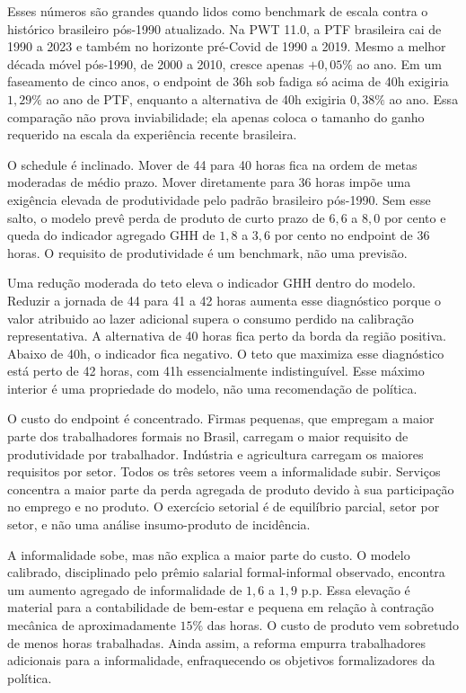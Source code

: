 \documentclass[10pt,twocolumn]{article}
\begin{document}
Esses n\'umeros s\~ao grandes quando lidos como benchmark de escala contra o hist\'orico brasileiro p\'os-1990 atualizado. Na PWT 11.0, a PTF brasileira cai de 1990 a 2023 e tamb\'em no horizonte pr\'e-Covid de 1990 a 2019. Mesmo a melhor d\'ecada m\'ovel p\'os-1990, de 2000 a 2010, cresce apenas $+0{,}05\%$ ao ano. Em um faseamento de cinco anos, o endpoint de 36h sob fadiga s\'o acima de 40h exigiria $1{,}29\%$ ao ano de PTF, enquanto a alternativa de 40h exigiria $0{,}38\%$ ao ano. Essa compara\c{c}\~ao n\~ao prova inviabilidade; ela apenas coloca o tamanho do ganho requerido na escala da experi\^encia recente brasileira.

O schedule \'e inclinado. Mover de 44 para 40 horas fica na ordem de metas moderadas de m\'edio prazo. Mover diretamente para 36 horas imp\~oe uma exig\^encia elevada de produtividade pelo padr\~ao brasileiro p\'os-1990. Sem esse salto, o modelo prev\^e perda de produto de curto prazo de $6{,}6$ a $8{,}0$ por cento e queda do indicador agregado GHH de $1{,}8$ a $3{,}6$ por cento no endpoint de 36 horas. O requisito de produtividade \'e um benchmark, n\~ao uma previs\~ao.

Uma redu\c{c}\~ao moderada do teto eleva o indicador GHH dentro do modelo. Reduzir a jornada de 44 para 41 a 42 horas aumenta esse diagn\'ostico porque o valor atribuido ao lazer adicional supera o consumo perdido na calibra\c{c}\~ao representativa. A alternativa de 40 horas fica perto da borda da regi\~ao positiva. Abaixo de 40h, o indicador fica negativo. O teto que maximiza esse diagn\'ostico est\'a perto de 42 horas, com 41h essencialmente indistingu\'ivel. Esse m\'aximo interior \'e uma propriedade do modelo, n\~ao uma recomenda\c{c}\~ao de pol\'itica.

O custo do endpoint \'e concentrado. Firmas pequenas, que empregam a maior parte dos trabalhadores formais no Brasil, carregam o maior requisito de produtividade por trabalhador. Ind\'ustria e agricultura carregam os maiores requisitos por setor. Todos os tr\^es setores veem a informalidade subir. Servi\c{c}os concentra a maior parte da perda agregada de produto devido \`a sua participa\c{c}\~ao no emprego e no produto. O exerc\'icio setorial \'e de equil\'ibrio parcial, setor por setor, e n\~ao uma an\'alise insumo-produto de incid\^encia.

A informalidade sobe, mas n\~ao explica a maior parte do custo. O modelo calibrado, disciplinado pelo pr\^emio salarial formal-informal observado, encontra um aumento agregado de informalidade de $1{,}6$ a $1{,}9$ p.p. Essa eleva\c{c}\~ao \'e material para a contabilidade de bem-estar e pequena em rela\c{c}\~ao \`a contra\c{c}\~ao mec\^anica de aproximadamente $15\%$ das horas. O custo de produto vem sobretudo de menos horas trabalhadas. Ainda assim, a reforma empurra trabalhadores adicionais para a informalidade, enfraquecendo os objetivos formalizadores da pol\'itica.
\end{document}
